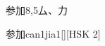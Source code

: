 \begin{entry}{参加}{8,5}{⼛、⼒}
  \begin{phonetics}{参加}{can1jia1}[][HSK 2]
  \end{phonetics}
\end{entry}
